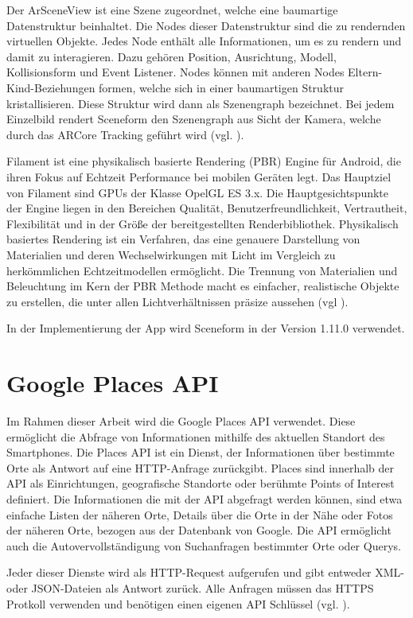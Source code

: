 Der ArSceneView ist eine Szene zugeordnet, welche eine baumartige Datenstruktur beinhaltet. Die Nodes dieser Datenstruktur sind die zu rendernden virtuellen Objekte. Jedes Node enthält alle Informationen, um es zu rendern und damit zu interagieren. Dazu gehören Position, Ausrichtung, Modell, Kollisionsform und Event Listener. Nodes können mit anderen Nodes Eltern-Kind-Beziehungen formen, welche sich in einer baumartigen Struktur kristallisieren. Diese Struktur wird dann als Szenengraph bezeichnet. Bei jedem Einzelbild rendert Sceneform den Szenengraph aus Sicht der Kamera, welche durch das ARCore Tracking geführt wird (vgl. \cite{sceneform_google}). 

Filament ist eine physikalisch basierte Rendering (PBR) Engine für Android, die ihren Fokus auf Echtzeit Performance bei mobilen Geräten legt. Das Hauptziel von Filament sind GPUs der Klasse OpelGL ES 3.x. Die Hauptgesichtspunkte der Engine liegen in den Bereichen Qualität, Benutzerfreundlichkeit, Vertrautheit, Flexibilität und in der Größe der bereitgestellten Renderbibliothek. Physikalisch basiertes Rendering ist ein Verfahren, das eine genauere Darstellung von Materialien und deren Wechselwirkungen mit Licht im Vergleich zu herkömmlichen Echtzeitmodellen ermöglicht. Die Trennung von Materialien und Beleuchtung im Kern der PBR Methode macht es einfacher, realistische Objekte zu erstellen, die unter allen Lichtverhältnissen präsize aussehen (vgl \cite{filament}). 

In der Implementierung der App wird Sceneform in der Version 1.11.0 verwendet.


\section{Google Places API}

Im Rahmen dieser Arbeit wird die Google Places API verwendet. Diese ermöglicht die Abfrage von Informationen mithilfe des aktuellen Standort des Smartphones. Die Places API ist ein Dienst, der Informationen über bestimmte Orte als Antwort auf eine HTTP-Anfrage zurückgibt. Places sind innerhalb der API als Einrichtungen, geografische Standorte oder berühmte Points of Interest definiert. Die Informationen die mit der API abgefragt werden können, sind etwa einfache Listen der näheren Orte, Details über die Orte in der Nähe oder Fotos der näheren Orte, bezogen aus der Datenbank von Google. Die API ermöglicht auch die  Autovervollständigung von Suchanfragen bestimmter Orte oder Querys. 

Jeder dieser Dienste wird als HTTP-Request aufgerufen und gibt entweder XML- oder JSON-Dateien als Antwort zurück. Alle Anfragen müssen das HTTPS Protkoll verwenden und benötigen einen eigenen API Schlüssel (vgl. \cite{places_api}).

